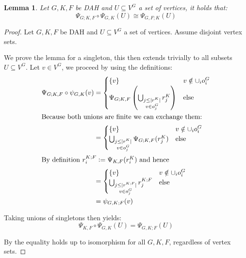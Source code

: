 \documentclass[12pt]{article}
\newtheorem{lemma}[theorem]{Lemma}
\theoremstyle{definition}
\newcommand{\defeq}{\vcentcolon=}
\newcommand{\1}{\mathbbm{1}}
\newcommand{\seq}{;}
\begin{document}
\begin{lemma}
    Let $G,K,F$ be DAH and $U\subseteq V^G$ a set of vertices, it holds that:
    \[
        \Psi_{G;K, F}\circ \Psi_{G, K}(U) \cong \Psi_{G, F;K}(U)
    \]
\end{lemma}

\begin{proof}
Let $G,K,F$ be DAH and $U\subseteq V^G$ a set of vertices. Assume disjoint vertex sets. 

We prove the lemma for a singleton, this then extends trivially to all subsets $U\subseteq V^G$. Let $v\in V^G$, we proceed by using the definitions:
    \begin{align*}
        \Psi_{G;K, F}\circ \psi_{G, K}(v) &= 
        \begin{cases}
            \{v\} & v\notin \cup_i o_i^G\\
            \Psi_{G;K, F}\left(\bigcup_{\substack{j \leq |r^K| \\ v \in o^G_j}} r^K_j\right) & \text{else}
        \end{cases}\\
        \intertext{Because both unions are finite we can exchange them: }
        &= 
        \begin{cases}
            \{v\} & v\notin \cup_i o_i^G\\
            \bigcup_{\substack{j \leq |r^K| \\ v \in o^G_j}} \Psi_{G;K, F} (r^K_j) & \text{else}\\
        \end{cases}\\
        \intertext{By definition $r^{K\seq F}_i \defeq \Psi_{K, F} (r^K_i)$ and hence}
        &=
        \begin{cases}
            \{v\} & v\notin \cup_i o_i^G\\
            \bigcup_{\substack{j\leq  |r^{K\seq F}| \\ v \in o^G_j}} r^{K\seq F}_j & \text{else}\\
        \end{cases}\\
        &= \psi_{G, K;F}(v)
    \end{align*}

    Taking unions of singletons then yields:
    \[
        \Psi_{K,F}\circ \Psi_{G, K}(U) = \Psi_{G,K;F}(U)
    \]

    By  the equality holds up to isomorphism for all $G,K,F$, regardless of vertex sets.
\end{proof}
\end{document}
